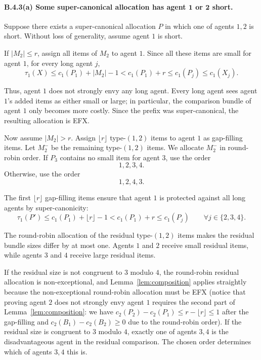 \documentclass{article}
\theoremstyle{definition}
\begin{document}
\paragraph{B.4.3(a) Some super-canonical allocation has agent $\boldsymbol{1}$ or $\boldsymbol{2}$ short.}
Suppose there exists a super-canonical allocation $P$ in which one of agents
$1,2$ is short.  Without loss of generality, assume agent $1$ is short.

If $|M_2|\le r$, assign all items of $M_2$ to agent $1$.  Since all these
items are small for agent $1$, for every long agent $j$,
\[
    \tau_1(X)\le c_1(P_1)+|M_2|-1
    < c_1(P_1)+r
    \le c_1(P_j)\le c_1(X_j).
\]

Thus, agent $1$ does not strongly envy any long agent.  Every long agent sees
agent $1$'s added items as either small or large; in particular, the comparison
bundle of agent $1$ only becomes more costly.  Since the prefix was
super-canonical, the resulting allocation is EFX.

Now assume $|M_2|>r$.  Assign $\lfloor r\rfloor$ type-$(1,2)$ items to agent
$1$ as gap-filling items.  Let $M_2^-$ be the remaining type-$(1,2)$ items.
We allocate $M_2^-$ in round-robin order.  If $P_3$ contains no small item for
agent $3$, use the order
\[
    1,2,3,4.
\]
Otherwise, use the order
\[
    1,2,4,3.
\]

The first $\lfloor r\rfloor$ gap-filling items ensure that agent $1$ is
protected against all long agents by super-canonicity:
\[
    \tau_1(P')\le c_1(P_1)+\lfloor r\rfloor-1
    < c_1(P_1)+r
    \le c_1(P_j)
    \qquad\forall j\in\{2,3,4\}.
\]

The round-robin allocation of the residual type-$(1,2)$ items makes the
residual bundle sizes differ by at most one.  Agents $1$ and $2$ receive
small residual items, while agents $3$ and $4$ receive large residual items.

If the residual size is not congruent to $3$ modulo $4$, the round-robin
residual allocation is non-exceptional, and Lemma~\ref{lem:composition}
applies straightly because the non-exceptional round-robin allocation must be EFX (notice that proving agent $2$ does not strongly envy agent $1$ requires the second part of Lemma~\ref{lem:composition}: we have $c_2(P_2)-c_2(P_1)\leq r-\lfloor r\rfloor\leq1$ after the gap-filling and $c_2(B_1)-c_2(B_2)\geq0$ due to the round-robin order).  If the residual size is congruent to $3$ modulo $4$, exactly one of
agents $3,4$ is the disadvantageous agent in the residual comparison.  The
chosen order determines which of agents $3,4$ this is.
\end{document}
